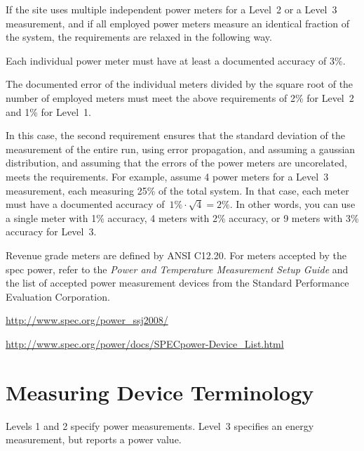 \noindent
If the site uses multiple independent power meters for a Level~2 or a Level~3 measurement, and if all employed power meters measure an identical fraction of the system, the requirements are relaxed in the following way.
\begin{packed_item}
\item 
Each individual power meter must have at least a documented accuracy of 3\%.
\item
The documented error of the individual meters divided by the square root of the number of employed meters must meet the above requirements of 2\% for Level~2 and 1\% for Level~1.
\end{packed_item}
In this case, the second requirement ensures that the standard deviation of the measurement of the entire run, using error propagation, and assuming a gaussian distribution, and assuming that the errors of the power meters are uncorelated, meets the requirements.
For example, assume 4 power meters for a Level~3 measurement, each measuring 25\% of the total system.
In that case, each meter must have a documented accuracy of~$1\% \cdot \sqrt{4} = 2\%$.
In other words, you can use a single meter with 1\% accuracy, 4 meters with 2\% accuracy, or 9 meters with 3\% accuracy for Level~3.
\wl

\noindent
Revenue grade meters are defined by ANSI C12.20.
For meters accepted by the spec power, refer to the {\itshape Power and Temperature Measurement Setup Guide \/} and the list of accepted power measurement devices from the Standard Performance Evaluation Corporation.
\begin{packed_item}
\item 
\url{http://www.spec.org/power_ssj2008/}
\item
\url{http://www.spec.org/power/docs/SPECpower-Device_List.html }
\end{packed_item}
\wl

\section{Measuring Device Terminology}
\label{sec:MDTerm}
\noindent
Levels 1 and 2 specify power measurements.
Level~3 specifies an energy measurement, but reports a power value.

